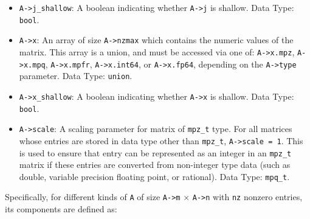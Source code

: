 \documentclass[12pt]{article}
\theoremstyle{definition}
\begin{document}
\begin{itemize}
\item \verb|A->j_shallow|: A boolean indicating whether \verb|A->j| is shallow.
Data Type: \verb|bool|.

\item \verb|A->x|: An array of size \verb|A->nzmax| which contains the
numeric values of the matrix.  This array is a union, and must be accessed via
one of: \verb|A->x.mpz|, \verb|A->x.mpq|, \verb|A->x.mpfr|, \verb|A->x.int64|,
or \verb|A->x.fp64|, depending on the \verb|A->type| parameter.
Data Type: \verb|union|.

\item \verb|A->x_shallow|: A boolean indicating whether \verb|A->x| is
shallow. Data Type: \verb|bool|.

\item \verb|A->scale|: A scaling parameter for matrix of \verb|mpz_t| type. For
all matrices whose entries are stored in data type other than \verb|mpz_t|,
\verb|A->scale = 1|. This is used to ensure that entry can be represented as an
integer in an \verb|mpz_t| matrix if these entries are converted from non-integer type
data (such as double, variable precision floating point, or rational). Data
Type: \verb|mpq_t|.

\end{itemize}

Specifically, for different kinds of \verb|A| of size \verb|A->m| $\times$ \verb|A->n|
with \verb|nz| nonzero entries, its components are defined as:
\end{document}
